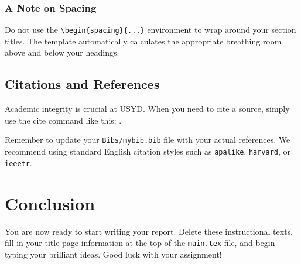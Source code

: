 \documentclass[twoside]{USYDReport}
\begin{document}
    \subsubsection{A Note on Spacing}
    Do not use the \verb|\begin{spacing}{...}| environment to wrap around your section titles. The template automatically calculates the appropriate breathing room above and below your headings.

    \subsection{Citations and References}
    Academic integrity is crucial at USYD. When you need to cite a source, simply use the cite command like this: \cite{example_reference}. 
    
    Remember to update your \verb|Bibs/mybib.bib| file with your actual references. We recommend using standard English citation styles such as \verb|apalike|, \verb|harvard|, or \verb|ieeetr|.

    \section{Conclusion}
    
    You are now ready to start writing your report. Delete these instructional texts, fill in your title page information at the top of the \verb|main.tex| file, and begin typing your brilliant ideas. Good luck with your assignment!
	
    \clearpage
\end{document}
